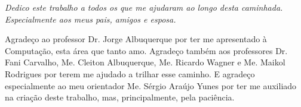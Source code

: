 \documentclass[
	12pt,				%
	openany,			%
	oneside,			%
	a4paper,			%
	english,			%
	brazil				%
	]{{Modelo/abntex2_FBUNI}}
\begin{document}


\frenchspacing 


\imprimircapa

\imprimirfolhaderosto*



\imprimirfolhadeaprovacao

%
\cleardoublepage

\begin{dedicatoria}
   \vspace*{\fill}
   \centering
   \noindent
   \textit{
    Dedico este trabalho a todos os que me ajudaram ao longo desta caminhada. Especialmente aos meus pais, amigos e esposa.
   }
   \vspace*{\fill}
\end{dedicatoria}

\begin{agradecimentos}
    Agradeço ao professor Dr. Jorge Albuquerque por ter me apresentado à Computação, esta área que tanto amo. Agradeço também aos professores Dr. Fani Carvalho, Me. Cleiton Albuquerque, Me. Ricardo Wagner e Me. Maikol Rodrigues por terem me ajudado a trilhar esse caminho. E agradeço especialmente ao meu orientador Me. Sérgio Araújo Yunes por ter me auxiliado na criação deste trabalho, mas, principalmente, pela paciência.
    
\end{agradecimentos}
\end{document}

